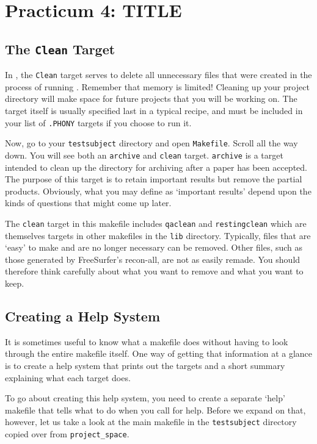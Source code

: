 \chapter*{Practicum 4: TITLE }
\label{sec:practicum4}

\section{The \texttt{Clean} Target}
In \maken{}, the \texttt{Clean} target serves to delete all unnecessary files that were created in the process of running \maken{}. Remember that memory is limited! Cleaning up your project directory will make space for future projects that you will be working on. The target itself is usually specified last in a typical \maken{} recipe, and must be included in your list of \texttt{.PHONY} targets if you choose to run it. 

Now, go to your \texttt{testsubject} directory and open \texttt{Makefile}. Scroll all the way down. You will see both an \texttt{archive} and \texttt{clean} target. \texttt{archive} is a target intended to clean up the directory for archiving after a paper has been accepted. The purpose of this target is to retain important results but remove the partial products. Obviously, what you may define as `important results' depend upon the kinds of questions that might come up later. 


The \texttt{clean} target in this makefile includes \texttt{qaclean} and \texttt{restingclean} which are themselves targets in other makefiles in the \texttt{lib} directory. Typically, files that are `easy' to make and are no longer necessary can be removed. Other files, such as those generated by FreeSurfer's recon-all, are not as easily remade. You should therefore think carefully about what you want to remove and what you want to keep.  

\section{Creating a \maken{} Help System}
It is sometimes useful to know what a makefile does without having to look through the entire makefile itself. One way of getting that information at a glance is to create a \maken{} help system that prints out the targets and a short summary explaining what each target does. 

To go about creating this help system, you need to create a separate `help' makefile that tells \maken{} what to do when you call for help. Before we expand on that, however, let us take a look at the main makefile in the \texttt{testsubject} directory copied over from \texttt{project_space}.

